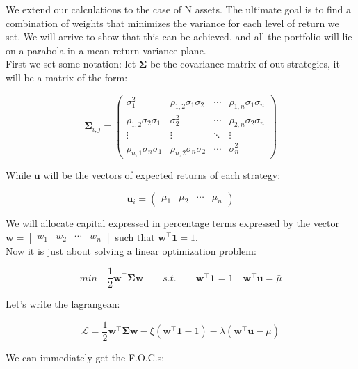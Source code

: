 We extend our calculations to the case of N assets. The ultimate goal is to find a combination of weights that minimizes the variance for each level of return we set. We will arrive to show that this can be achieved, and all the portfolio will lie on a parabola in a mean return-variance plane.\\
First we set some notation: let $\mathbf{\Sigma}$ be the covariance matrix of out strategies, it will be a matrix of the form:

$$
\mathbf{\Sigma}_{i,j} = 
\begin{pmatrix}
\sigma_{1}^2 & \rho_{1,2}\sigma_1\sigma_2 & \cdots & \rho_{1,n}\sigma_1\sigma_n \\
\rho_{1,2}\sigma_2\sigma_1 & \sigma_2^2 &   \cdots & \rho_{2,n}\sigma_2\sigma_n \\
\vdots  & \vdots  & \ddots & \vdots  \\
\rho_{n,1}\sigma_n\sigma_1 & \rho_{n,2}\sigma_n\sigma_2 & \cdots & \sigma_n^2 
\end{pmatrix}
$$

While $\mathbf{u}$ will be the vectors of expected returns of each strategy:

$$
\mathbf{u}_{i} = 
\begin{pmatrix}
\mu_1 & \mu_2 & \cdots & \mu_n  
\end{pmatrix}
$$

We will allocate capital expressed in percentage terms expressed by the vector 
$\mathbf{w} = \begin{bmatrix} w_1 & w_2 & \cdots & w_n \end{bmatrix}$ such that $\mathbf{w}^\top \mathbf{1} = 1$.\\
Now it is just about solving a linear optimization problem:

\begin{equation} \label{min_problem}
min \quad \frac{1}{2}\mathbf{w}^\top\mathbf{\Sigma}\mathbf{w} \qquad s.t. \qquad \mathbf{w}^\top \mathbf{1} = 1 \quad \mathbf{w}^\top \mathbf{u} = \bar{\mu}
\end{equation}

Let's write the lagrangean:

\begin{equation} \label{lagrangean}
\mathcal{L} =  \frac{1}{2}\mathbf{w}^\top\mathbf{\Sigma}\mathbf{w} -\xi(\mathbf{w}^\top \mathbf{1} - 1) - \lambda(\mathbf{w}^\top \mathbf{u} - \bar{\mu})
\end{equation}

We can immediately get the F.O.C.s:

